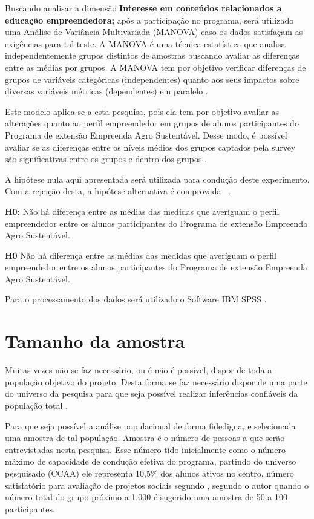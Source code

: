 Buscando analisar a dimensão \textbf{Interesse em conteúdos relacionados a educação empreendedora;} após a participação no programa, será utilizado uma Análise de Variância Multivariada (MANOVA) caso os dados satisfaçam as exigências para tal teste. A MANOVA é uma técnica estatística que analisa independentemente grupos distintos de amostras buscando avaliar as diferenças entre as médias por grupos. A MANOVA tem por objetivo verificar diferenças de grupos de variáveis categóricas (independentes) quanto aos seus impactos sobre diversas variáveis métricas (dependentes) em paralelo  \cite{hair_alise_2009}. 

Este modelo aplica-se a esta pesquisa, pois ela tem por objetivo avaliar as alterações quanto ao perfil empreendedor em grupos de alunos participantes do Programa de extensão Empreenda Agro Sustentável. Desse modo, é possível avaliar se as diferenças entre os níveis médios dos grupos captados pela \textit{}{survey} são significativas entre os grupos e dentro dos grupos \cite{rocha_avaliacao_2014}. 

A hipótese nula aqui apresentada será utilizada para condução deste experimento. Com a rejeição desta, a hipótese alternativa é comprovada \ \cite{hair_alise_2009}.

\textbf{H0:} Não há diferença entre as médias das medidas que averíguam o perfil empreendedor entre os alunos participantes do Programa de extensão Empreenda Agro Sustentável.

\textbf{H0} Não há diferença entre as médias das medidas que averíguam o perfil empreendedor entre os alunos participantes do Programa de extensão Empreenda Agro Sustentável.



Para o processamento dos dados será utilizado o Software IBM SPSS \cite{ibm_corp_ibm_2017}. 


\section{Tamanho da amostra}

Muitas  vezes  não  se  faz necessário,  ou  é não é possível,  dispor  de toda a população objetivo  do  projeto. Desta forma se faz necessário dispor de uma parte do universo da pesquisa para que seja possível realizar inferências confiáveis da população total \cite{marino_manual_2003}.

Para que seja possível a análise populacional de forma fidedigna, e selecionada uma amostra de tal população. Amostra é o número de pessoas a que serão entrevistadas nesta pesquisa. Esse número tido inicialmente como o número máximo de capacidade de condução efetiva do programa, partindo do universo pesquisado (CCAA) ele representa 10,5\% dos alunos ativos no centro, número satisfatório para avaliação de projetos sociais segundo , segundo o autor quando o número total do grupo próximo a 1.000 é sugerido uma amostra de 50 a 100 participantes. 

